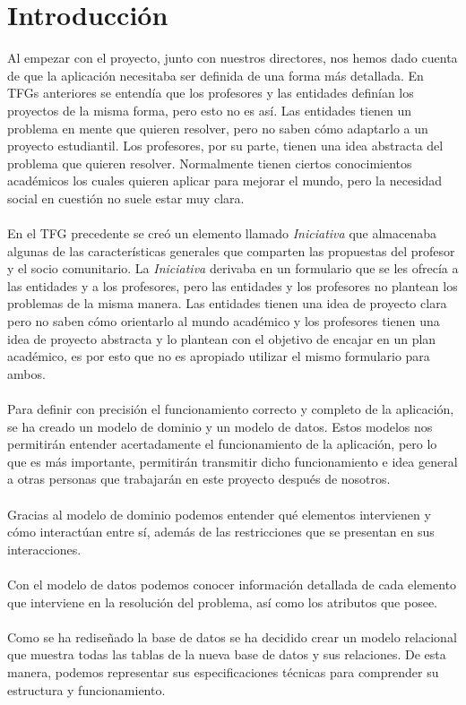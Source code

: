 \documentclass[11pt]{book}
\begin{document}
	\section{Introducción}
	Al empezar con el proyecto, junto con nuestros directores, nos hemos dado cuenta de que la aplicación necesitaba ser definida de una forma más detallada. En TFGs anteriores se entendía que los profesores y las entidades definían los proyectos de la misma forma, pero esto no es así. Las entidades tienen un problema en mente que quieren resolver, pero no saben cómo adaptarlo a un proyecto estudiantil. Los profesores, por su parte, tienen una idea abstracta del problema que quieren resolver. Normalmente tienen ciertos conocimientos académicos los cuales quieren aplicar para mejorar el mundo, pero la necesidad social en cuestión no suele estar muy clara.\\\\
	En el TFG precedente se creó un elemento llamado \emph{Iniciativa} que almacenaba algunas de las características generales que comparten las propuestas del profesor y el socio comunitario. La \emph{Iniciativa} derivaba en un formulario que se les ofrecía a las entidades y a los profesores, pero las entidades y los profesores no plantean los problemas de la misma manera. Las entidades tienen una idea de proyecto clara pero no saben cómo orientarlo al mundo académico y los profesores tienen una idea de proyecto abstracta y lo plantean con el objetivo de encajar en un plan académico, es por esto que no es apropiado utilizar el mismo formulario para ambos.\\\\
	Para definir con precisión el funcionamiento correcto y completo de la aplicación, se ha creado un modelo de dominio y un modelo de datos.
	Estos modelos nos permitirán entender acertadamente el funcionamiento de la aplicación, pero lo que es más importante, permitirán transmitir dicho funcionamiento e idea general a otras personas que trabajarán en este proyecto después de nosotros.\\\\
	Gracias al modelo de dominio podemos entender qué elementos intervienen y cómo interactúan entre sí, además de las restricciones que se presentan en sus interacciones.\\\\
	Con el modelo de datos podemos conocer información detallada de cada elemento que interviene en la resolución del problema, así como los atributos que posee.\\\\
	Como se ha rediseñado la base de datos se ha decidido crear un modelo relacional que muestra todas las tablas de la nueva base de datos y sus relaciones. De esta manera, podemos representar sus especificaciones técnicas para comprender su estructura y funcionamiento. 
	
\end{document}
